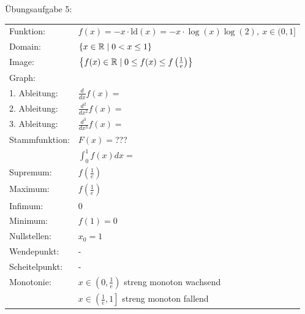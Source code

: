 

	Übungsaufgabe 5:\newline
	\begin{tabular}{l l}
		Funktion:		& $f(x) = -x \cdot \text{ld}(x) = -x\cdot{\log(x)}{\log(2)},\ x\in(0,1]$\\
		Domain:			& $\left\lbrace x\in{\mathbb R}\mid 0 < x \le 1\right\rbrace$\\
		Image:			& $\left\lbrace f(x)\in{\mathbb R}\mid 0 \le f(x) \le f\left(\frac{1}{e}\right) \right\rbrace$\\
		Graph:			& \\%
		1. Ableitung:	& $\frac{d}{dx}f(x) = $\\
		2. Ableitung:	& $\frac{d^2}{dx^2}f(x) = $\\
		3. Ableitung:	& $\frac{d^3}{dx^3}f(x) = $\\
		Stammfunktion:	& $F(x) = $???\\
		& $\int_0^1 f(x) dx = $\\
		Supremum:		& $f\left(\frac{1}{e}\right)$\\
		Maximum:		& $f\left(\frac{1}{e}\right)$\\
		Infimum:		& $0$\\
		Minimum:		& $f(1) = 0$\\
		Nullstellen:	& $x_0 = 1$\\
		Wendepunkt:		& -\\
		Scheitelpunkt:	& -\\
		Monotonie:		& $x\in\left(0,\frac{1}{e}\right)$ streng monoton wachsend\\
		& $x\in\left(\frac{1}{e},1\right]$ streng monoton fallend
		
	\end{tabular}
